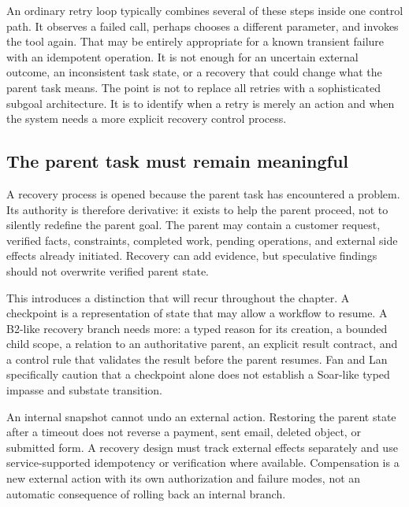 An ordinary retry loop typically combines several of these steps inside one control path. It observes a failed call, perhaps chooses a different parameter, and invokes the tool again. That may be entirely appropriate for a known transient failure with an idempotent operation. It is not enough for an uncertain external outcome, an inconsistent task state, or a recovery that could change what the parent task means. The point is not to replace all retries with a sophisticated subgoal architecture. It is to identify when a retry is merely an action and when the system needs a more explicit recovery control process.

\subsection{The parent task must remain meaningful}

A recovery process is opened because the parent task has encountered a problem. Its authority is therefore derivative: it exists to help the parent proceed, not to silently redefine the parent goal. The parent may contain a customer request, verified facts, constraints, completed work, pending operations, and external side effects already initiated. Recovery can add evidence, but speculative findings should not overwrite verified parent state.

This introduces a distinction that will recur throughout the chapter. A checkpoint is a representation of state that may allow a workflow to resume. A B2-like recovery branch needs more: a typed reason for its creation, a bounded child scope, a relation to an authoritative parent, an explicit result contract, and a control rule that validates the result before the parent resumes. Fan and Lan specifically caution that a checkpoint alone does not establish a Soar-like typed impasse and substate transition.

\begin{warningbox}
An internal snapshot cannot undo an external action. Restoring the parent state after a timeout does not reverse a payment, sent email, deleted object, or submitted form. A recovery design must track external effects separately and use service-supported idempotency or verification where available. Compensation is a new external action with its own authorization and failure modes, not an automatic consequence of rolling back an internal branch.
\end{warningbox}

